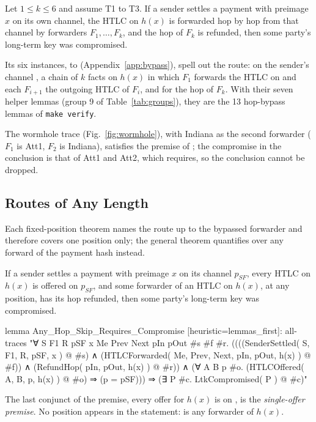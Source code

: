 \begin{theorem}
Let $1 \le k \le 6$ and assume T1 to T3. If a sender settles a payment with preimage $x$ on its own channel, the
HTLC on $h(x)$ is forwarded hop by hop from that channel by forwarders $F_1, \dots, F_k$, and
the hop of $F_k$ is refunded, then some party's long-term key was compromised.
\end{theorem}
\noindent Its six instances,  to
 (Appendix~\ref{app:bypass}), spell out the route:
 on the sender's channel , a chain of $k$ 
facts on $h(x)$ in which $F_1$ forwards the HTLC on  and each $F_{i+1}$ the outgoing
HTLC of $F_i$, and  for the hop of $F_k$. With their seven helper lemmas (group 9
of Table~\ref{tab:groups}), they are the 13 hop-bypass lemmas of \texttt{make verify}.

The wormhole trace  (Fig.~\ref{fig:wormhole}), with Indiana
as the second forwarder ($F_1$ is Att1, $F_2$ is Indiana), satisfies the premise of
; the compromise in the conclusion is that of Att1 and
Att2, which  requires, so the conclusion cannot be dropped.

\subsection{Routes of Any Length}\label{sec:bypass-any}

Each fixed-position theorem names the route up to the bypassed forwarder and therefore covers
one position only; the general theorem quantifies over any forward of the payment hash instead.

\begin{theorem}\label{thm:anyhop}
If a sender settles a payment with preimage $x$ on its channel $p_{SF}$, every HTLC on $h(x)$
is offered on $p_{SF}$, and some forwarder of an HTLC on $h(x)$, at any position, has its hop
refunded, then some party's long-term key was compromised.
\end{theorem}
\begin{spthy}
lemma Any_Hop_Skip_Requires_Compromise [heuristic={lemmas_first}]:
  all-traces
  "∀ S F1 R pSF x Me Prev Next pIn pOut #s #f #r.
    ((((SenderSettled( S, F1, R, pSF, x ) @ #s) ∧
       (HTLCForwarded( Me, Prev, Next, pIn, pOut, h(x) ) @ #f)) ∧
      (RefundHop( pIn, pOut, h(x) ) @ #r)) ∧
     (∀ A B p #o. (HTLCOffered( A, B, p, h(x) ) @ #o) ⇒ (p = pSF))) ⇒
    (∃ P #c. LtkCompromised( P ) @ #c)"
\end{spthy}
The last conjunct of the premise, every offer for $h(x)$ is on , is the
\emph{single-offer premise}. No position appears in the statement:  is any forwarder of
$h(x)$.

